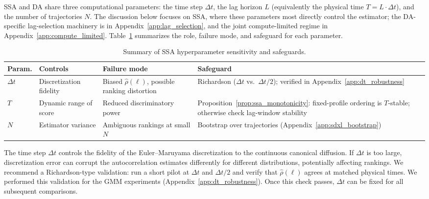 \documentclass{article}
\begin{document}
SSA and DA share three computational parameters: the time step $\Delta t$, the lag horizon $L$ (equivalently the physical time $T = L \cdot \Delta t$), and the number of trajectories $N$. The discussion below focuses on SSA, where these parameters most directly control the estimator; the DA-specific lag-selection machinery is in Appendix~\ref{app:lag_selection}, and the joint compute-limited regime in Appendix~\ref{app:compute_limited}. Table~\ref{tab:hp_summary} summarizes the role, failure mode, and safeguard for each parameter.

\begin{table}[H]
\centering
\caption{  Summary of SSA hyperparameter sensitivity and safeguards.}
\label{tab:hp_summary}
 
\setlength{\tabcolsep}{4pt}
\begin{tabular}{@{}p{}p{}p{}p{}@{}}
\toprule
Param. & Controls & Failure mode & Safeguard \\
\midrule
$\Delta t$ & Discretization fidelity & Biased $\hat\rho(\ell)$, possible ranking distortion &
Richardson ($\Delta t$ vs.\ $\Delta t/2$); verified in Appendix~\ref{app:dt_robustness} \\
$T$ & Dynamic range of score & Reduced discriminatory power &
Proposition~\ref{prop:ssa_monotonicity}: fixed-profile ordering is $T$-stable; otherwise check lag-window stability \\
$N$ & Estimator variance & Ambiguous rankings at small $N$ &
Bootstrap over trajectories (Appendix~\ref{app:sdxl_bootstrap}) \\
\bottomrule
\end{tabular}
\end{table}

The time step $\Delta t$ controls the fidelity of the Euler--Maruyama discretization to the continuous canonical diffusion. If $\Delta t$ is too large, discretization error can corrupt the autocorrelation estimates differently for different distributions, potentially affecting rankings. We recommend a Richardson-type validation: run a short pilot at $\Delta t$ and $\Delta t/2$ and verify that $\hat{\rho}(\ell)$ agrees at matched physical times. We performed this validation for the GMM experiments (Appendix~\ref{app:dt_robustness}). Once this check passes, $\Delta t$ can be fixed for all subsequent comparisons.
\end{document}
